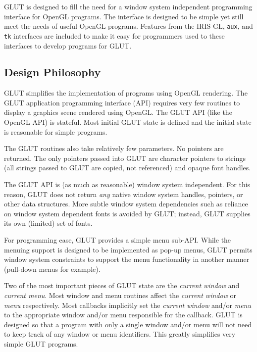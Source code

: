 GLUT is designed to fill the need for a window system independent
programming interface for OpenGL programs.  The interface is designed
to be simple yet still meet the needs of useful OpenGL programs.
Features from the IRIS GL, {\tt aux}, and {\tt tk} interfaces are
included to make it easy for programmers used to these interfaces
to develop programs for GLUT.

\subsection{Design Philosophy}

GLUT simplifies the implementation of programs using OpenGL rendering.
The GLUT application programming interface (API) requires very few routines
to display a graphics scene rendered using OpenGL.  The GLUT API (like the OpenGL
API) is stateful.  Most initial GLUT state is defined and the
initial state is reasonable for simple programs.

The GLUT routines also take relatively few parameters.
No pointers are returned.  The only pointers passed into GLUT are character pointers
to strings (all strings passed to GLUT are copied, not referenced)
and opaque font handles.

The GLUT API is (as much as reasonable) window system independent.  For
this reason, GLUT does not return {\em any} native window system handles,
pointers, or other data structures.  More subtle window system dependencies
such as reliance on window system dependent fonts is avoided by GLUT; instead,
GLUT supplies its own (limited) set of fonts. 


For programming ease, GLUT provides a simple menu sub-API.  While the menuing
support is designed to be implemented as pop-up menus, GLUT permits window system
constraints to support the menu functionality in another manner (pull-down menus
for example).

Two of the most important pieces of GLUT state are the {\em current window}
and {\em current menu}.  Most window and menu routines affect the {\em
current window} or {\em menu} respectively.  Most callbacks implicitly
set the {\em current window} and/or {\em menu} to the appropriate
window and/or menu responsible for the callback.  GLUT is designed
so that a program with only a single window and/or menu will not need
to keep track of any window or menu identifiers.  This greatly
simplifies very simple GLUT programs.

